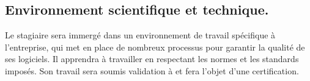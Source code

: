 \documentclass[init,francais]{rapportPFE}  %
\begin{document}
\subsection{Environnement scientifique et technique.}
Le stagiaire sera immergé dans un environnement de travail spécifique à l'entreprise, 
qui met en place de nombreux processus pour garantir la qualité de ses logiciels. 
Il apprendra à travailler en respectant les normes et les standards imposés. Son travail sera soumis validation à et fera l'objet d'une certification.



% 
% 
\end{document}

